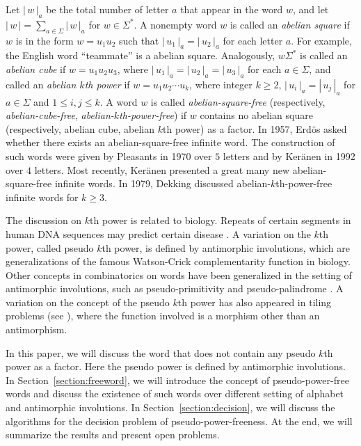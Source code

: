 \documentclass[12pt]{article}
\def\abs#1{{|\,#1\,|}}
\begin{document}
Let $\abs{w}_a$ be the total number of letter $a$ that appear in the
word $w$, and let $\abs{w}=\sum_{a\in\Sigma}\abs{w}_a$ for
$w\in\Sigma^*$. A nonempty word $w$ is called an \emph{abelian
square} if $w$ is in the form $w=u_1u_2$ such that
$\abs{u_1}_a=\abs{u_2}_a$ for each letter $a$. For example, the
English word ``teammate'' is a abelian square. Analogously,
$w\Sigma^*$ is called an \emph{abelian cube} if $w=u_1u_2u_3$, where
$\abs{u_1}_a=\abs{u_2}_a=\abs{u_3}_a$ for each $a\in\Sigma$, and
called an \emph{abelian $k$th power} if $w=u_1u_2\cdots u_k$, where
integer $k\geq 2$, $\abs{u_i}_a=\abs{u_j}_a$ for $a\in\Sigma$ and
$1\leq i,j\leq k$. A word $w$ is called \emph{abelian-square-free}
(respectively, \emph{abelian-cube-free},
\emph{abelian-$k$th-power-free}) if $w$ contains no abelian square
(respectively, abelian cube, abelian $k$th power) as a factor. In
1957, Erd\"os \cite{Erdos1957} asked whether there exists an
abelian-square-free infinite word. The construction of such words
were given by Pleasants \cite{Pleasants1970} in 1970 over $5$
letters and by Ker\"anen \cite{Keranen1992} in 1992 over $4$
letters. Most recently, Ker\"anen \cite{Keranen2009} presented a
great many new abelian-square-free infinite words. In 1979, Dekking
\cite{Dekking1979} discussed abelian-$k$th-power-free infinite words
for $k\geq 3$.


The discussion on $k$th power is related to biology. Repeats of
certain segments in human DNA sequences may predict certain disease
\cite{Mirkin2007}. A variation on the $k$th power, called pseudo
$k$th power, is defined by antimorphic involutions, which are
generalizations of the famous Watson-Crick complementarity function
in biology. Other concepts in combinatorics on words have been
generalized in the setting of antimorphic involutions, such as
pseudo-primitivity \cite{Czeizler&Kari&Seki2009} and
pseudo-palindrome \cite{Kari&Mahalingam2009}. A variation on the
concept of the pseudo $k$th power has also appeared in tiling
problems (see \cite{Beauquier&Nivat1991,Braquelaire&Vialard1999}),
where the function involved is a morphism other than an
antimorphism.


In this paper, we will discuss the word that does not contain any
pseudo $k$th power as a factor. Here the pseudo power is defined by
antimorphic involutions. In Section~\ref{section:freeword}, we will
introduce the concept of pseudo-power-free words and discuss the
existence of such words over different setting of alphabet and
antimorphic involutions. In Section~\ref{section:decision}, we will
discuss the algorithms for the decision problem of
pseudo-power-freeness. At the end, we will summarize the results and
present open problems.
\end{document}
